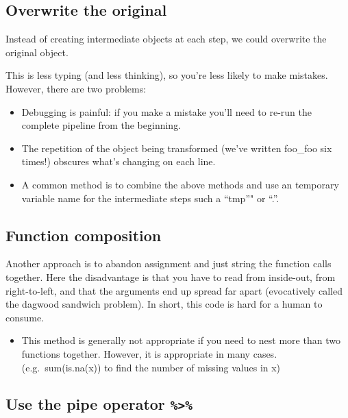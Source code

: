 \documentclass[]{book}
\providecommand{\tightlist}{%
  \setlength{\itemsep}{0pt}\setlength{\parskip}{0pt}}
\newenvironment{rmdblock}[1]
  {\begin{shaded*}
  \begin{itemize}
  \renewcommand{\labelitemi}{
    \raisebox{-.7\height}[0pt][0pt]{
      {\setkeys{Gin}{width=3em,keepaspectratio}\texttt{[image: images/\#1]}}
    }
  }
  \item
  }
  {
  \end{itemize}
  \end{shaded*}
  }
\newenvironment{rmdnote}
  {\begin{rmdblock}{note}}
  {\end{rmdblock}}
\theoremstyle{definition}
\theoremstyle{definition}
\theoremstyle{definition}
\theoremstyle{remark}
\begin{document}
\subsection{Overwrite the original}\label{overwrite-the-original}

Instead of creating intermediate objects at each step, we could
overwrite the original object.

This is less typing (and less thinking), so you're less likely to make
mistakes. However, there are two problems:

\begin{itemize}
\tightlist
\item
  Debugging is painful: if you make a mistake you'll need to re-run the
  complete pipeline from the beginning.
\item
  The repetition of the object being transformed (we've written foo\_foo
  six times!) obscures what's changing on each line.
\end{itemize}

\begin{rmdnote}
A common method is to combine the above methods and use an temporary
variable name for the intermediate steps such a ``tmp''" or ``.''.
\end{rmdnote}

\subsection{Function composition}\label{function-composition}

Another approach is to abandon assignment and just string the function
calls together. Here the disadvantage is that you have to read from
inside-out, from right-to-left, and that the arguments end up spread far
apart (evocatively called the dagwood sandwich problem). In short, this
code is hard for a human to consume.

\begin{rmdnote}
This method is generally not appropriate if you need to nest more than
two functions together. However, it is appropriate in many cases.
(e.g.~sum(is.na(x)) to find the number of missing values in x)
\end{rmdnote}

\subsection{\texorpdfstring{Use the pipe operator
\texttt{\%\textgreater{}\%}}{Use the pipe operator \%\textgreater{}\%}}\label{use-the-pipe-operator}
\end{document}
